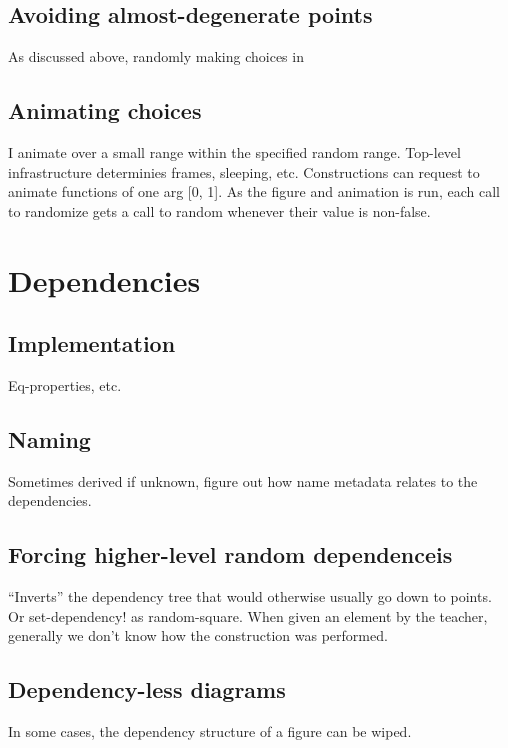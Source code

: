 \subsection{Avoiding almost-degenerate points}

As discussed above, randomly making choices in

\subsection{Animating choices}

I animate over a small range within the specified random
range. Top-level infrastructure determinies frames, sleeping, etc.
Constructions can request to animate functions of one arg [0, 1]. As
the figure and animation is run, each call to randomize gets a call to
random whenever their value is non-false.

\section{Dependencies}

\subsection{Implementation}

Eq-properties, etc.

\subsection{Naming}

Sometimes derived if unknown, figure out how name metadata relates to
the dependencies.

\subsection{Forcing higher-level random dependenceis}

``Inverts'' the dependency tree that would otherwise usually go
down to points. Or set-dependency! as random-square. When given an
element by the teacher, generally we don't know how the construction
was performed.

\subsection{Dependency-less diagrams}

In some cases, the dependency structure of a figure can be wiped.

